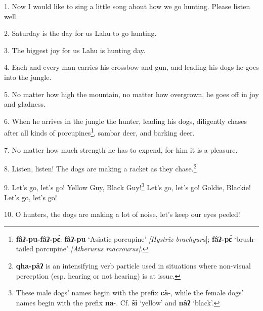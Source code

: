 \setcounter{footnote}{0}

1. Now I would like to sing a little song about how we go hunting. Please listen
well.

2. Saturday is the day for us Lahu to go hunting.

3. The biggest joy for us Lahu is hunting day.

4. Each and every man carries his crossbow and gun, and leading his dogs he goes
into the jungle.

5. No matter how high the mountain, no matter how overgrown, he goes off in joy
and gladness.

6. When he arrives in the jungle the hunter, leading his dogs, diligently chases
after all kinds of porcupines\footnote{\textbf{fâʔ-pu-fâʔ-pɛ́}: \textbf{fâʔ-pu} `Asiatic porcupine'\textit{ [Hystrix brachyura}]; \textbf{fâʔ-pɛ́} `brush-tailed porcupine' \textit{[Atherurus macrourus]}.}, sambar deer, and barking deer.

7. No matter how much strength he has to expend, for him it is a pleasure.

8. Listen, listen! The dogs are making a racket as they chase.\footnote{\textbf{qha-pâʔ} is an intensifying verb particle used in situations where non-visual perception (esp. hearing or not hearing) is at issue.}

9. Let's go, let's go! Yellow Guy, Black Guy!\footnote{These male dogs' names begin with the prefix \textbf{cà}-, while the female dogs' names begin with the prefix \textbf{na}-. Cf. \textbf{ši} `yellow' and \textbf{nâʔ} `black'.} Let's go, let's go! Goldie, Blackie!
Let's go, let's go!

10. O hunters, the dogs are making a lot of noise, let's keep our eyes peeled!

